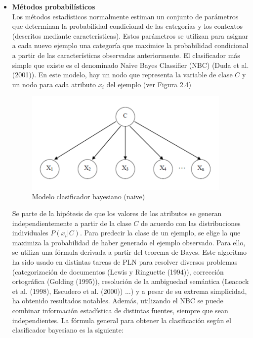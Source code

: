 \begin{itemize}
  \item \textbf{Métodos probabilísticos} \\
  Los métodos estadísticos normalmente estiman un conjunto de parámetros que determinan la probabilidad condicional de las categorías y los contextos (descritos mediante características). Estos parámetros se utilizan para asignar a cada nuevo ejemplo una categoría que maximice la probabilidad condicional a partir de las características observadas anteriormente. El clasificador más simple que existe es el denominado Naive Bayes Classifier (NBC) (Duda et al. (2001)). En este modelo, hay un nodo que representa la variable de clase $C$ y un nodo para cada atributo $x_i$ del ejemplo (ver Figura 2.4)

  \begin{figure}[h!]
    \begin{center}
    \includegraphics[angle=0, width=10cm]{Graficos/bayesiano}
    \caption{Modelo clasificador bayesiano (naive)}
    \label{fig:bayesiano}
    \end{center}
  \end{figure}
  Se parte de la hipótesis de que los valores de los atributos se generan independientemente a partir de la clase $C$ de acuerdo con las distribuciones individuales $P(x_i|C)$. Para predecir la clase de un ejemplo, se elige la que maximiza la probabilidad de haber generado el ejemplo observado. Para ello, se utiliza una fórmula derivada a partir del teorema de Bayes. Este algoritmo ha sido usado en distintas tareas de PLN para resolver diversos problemas (categorización de documentos (Lewis y Ringuette (1994)), corrección ortográfica (Golding (1995)), resolución de la ambiguedad semántica (Leacock et al. (1998), Escudero et al. (2000)) ...) y a pesar de su extrema simplicidad, ha obtenido resultados notables. Además, utilizando el NBC se puede combinar información estadística de distintas fuentes, siempre que sean independientes. La fórmula general para obtener la clasificación según el clasificador bayesiano es la siguiente:
  

\end{itemize}
